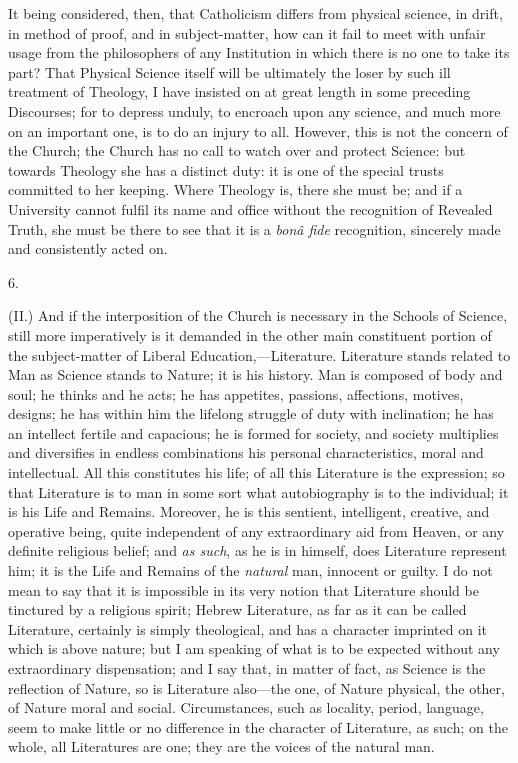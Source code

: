 It being considered, then, that Catholicism differs from physical
science, in drift, in method of proof, and in subject-matter, how can
it fail to meet with unfair usage from the philosophers of any
Institution in which there is no one to take its part? That Physical
Science itself will be ultimately the loser by such ill treatment of
Theology, I have insisted on at great length in some preceding
Discourses; for to depress unduly, to encroach upon any science, and
much more on an important one, is to do an injury to all. However,
this is not the concern of the Church; the Church has no call to watch
over and protect Science: but towards Theology she has a distinct
duty: it is one of the special trusts committed to her keeping. Where
Theology is, there she must be; and if a University cannot fulfil its
name and office without the recognition of Revealed Truth, she must be
there to see that it is a \emph{bonâ fide} recognition, sincerely
made and consistently acted on.

6.

(II.) And if the interposition of the Church is necessary in the
Schools of Science, still more imperatively is it demanded in the
other main constituent portion of the subject-matter of Liberal
Education,—Literature. Literature stands related to Man as Science
stands to Nature; it is his history. Man is composed of body and soul;
he thinks and he acts; he has appetites, passions, affections,
motives, designs; he has within him the lifelong struggle of duty with
inclination; he has an intellect fertile and capacious; he is formed
for society, and society multiplies and diversifies in endless
combinations his personal characteristics, moral and intellectual. All
this constitutes his life; of all this Literature is the expression;
so that Literature is to man in some sort what autobiography is to the
individual; it is his Life and Remains. Moreover, he is this sentient,
intelligent, creative, and operative being, quite independent of any
extraordinary aid from Heaven, or any definite religious belief; and \emph{as
such}, as he is in himself, does Literature represent him; it is
the Life and Remains of the \emph{natural} man, innocent or
guilty. I do not mean to say that it is impossible in its very notion
that Literature should be tinctured by a religious spirit; Hebrew
Literature, as far as it can be called Literature, certainly is simply
theological, and has a character imprinted on it which is above
nature; but I am speaking of what is to be expected without any
extraordinary dispensation; and I say that, in matter of fact, as
Science is the reflection of Nature, so is Literature also—the one,
of Nature physical, the other, of Nature moral and social.
Circumstances, such as locality, period, language, seem to make little
or no difference in the character of Literature, as such; on the
whole, all Literatures are one; they are the voices of the natural
man.

